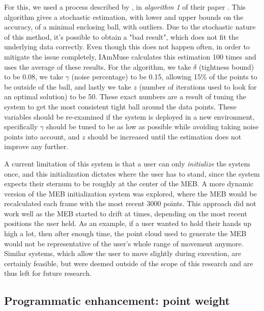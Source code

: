 For this, we used a process described by \citeauthor{ding2020sublinear}, in \textit{algorithm 1} of their paper \cite{ding2020sublinear}.
This algorithm gives a stochastic estimation, with lower and upper bounds on the accuracy, of a minimal enclosing ball, with outliers.
Due to the stochastic nature of this method, it's possible to obtain a "bad result", which does not fit the underlying data correctly.
Even though this does not happen often, in order to mitigate the issue completely, IAmMuse calculates this estimation 100 times and uses the average of these results.
For the algorithm, we take $\delta$ (tightness bound) to be 0.08, we take $\gamma$ (noise percentage) to be 0.15, allowing 15\% of the points to be outside of the ball, and lastly we take $z$ (number of iterations used to look for an optimal solution) to be 50.
These exact numbers are a result of tuning the system to get the most consistent tight ball around the data points.
These variables should be re-examined if the system is deployed in a new environment, specifically $\gamma$ should be tuned to be as low as possible while avoiding taking noise points into account, and $z$ should be increased until the estimation does not improve any further.

A current limitation of this system is that a user can only \textit{initialize} the system once, and this initialization dictates where the user has to stand, since the system expects their sternum to be roughly at the center of the MEB.
A more dynamic version of the MEB initialization system was explored, where the MEB would be recalculated each frame with the most recent 3000 points.
This approach did not work well as the MEB started to drift at times, depending on the most recent positions the user held.
As an example, if a user wanted to hold their hands up high a lot, then after enough time, the point cloud used to generate the MEB would not be representative of the user's whole range of movement anymore.
Similar systems, which allow the user to move slightly during execution, are certainly feasible, but were deemed outside of the scope of this research and are thus left for future research.


\subsection{Programmatic enhancement: point weight}
\label{sub-section: tracking method - data enhancement - programmatic enhancement}

